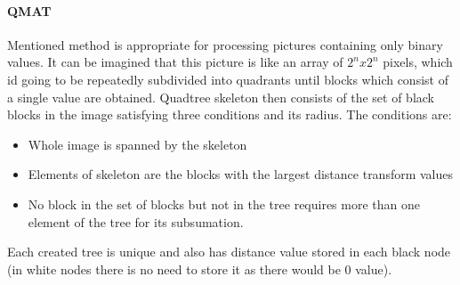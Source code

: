 \paragraph{QMAT}
Mentioned method is appropriate for processing pictures containing only binary values. It can be imagined that this picture is like an array of $2^n x 2^n$ pixels, which id going to be repeatedly subdivided into quadrants until blocks which consist of a single value are obtained.
Quadtree skeleton then consists of the set of black blocks in the image satisfying three conditions and its radius. The conditions are:
\begin{itemize}
\item Whole image is spanned by the skeleton
\item Elements of skeleton are the blocks with the largest distance transform values
\item No block in the set of blocks but not in the tree requires more than one element of the tree for its subsumation.
\end{itemize}
Each created tree is unique and also has distance value stored in each black node (in white nodes there is no need to store it as there would be 0 value).

